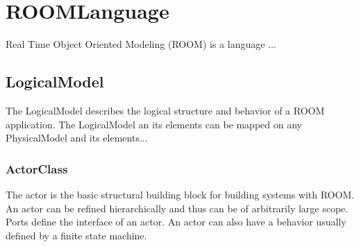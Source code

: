 \section{ROOMLanguage}
	Real Time Object Oriented Modeling (ROOM) is a language ... 
	
		\subsection{LogicalModel}
		The LogicalModel describes the logical structure and behavior of a ROOM application. The LogicalModel an its elements can be mapped on any PhysicalModel and its elements...
	
		
		
		\subsubsection{ActorClass}
			\hypertarget{ref:ActorClass}{}
			
			The actor is the basic structural building block for building systems with ROOM. An actor can be refined hierarchically and thus can be of arbitrarily large scope. Ports define the interface of an actor. An actor can also have a behavior usually defined by a finite state machine. 
			

